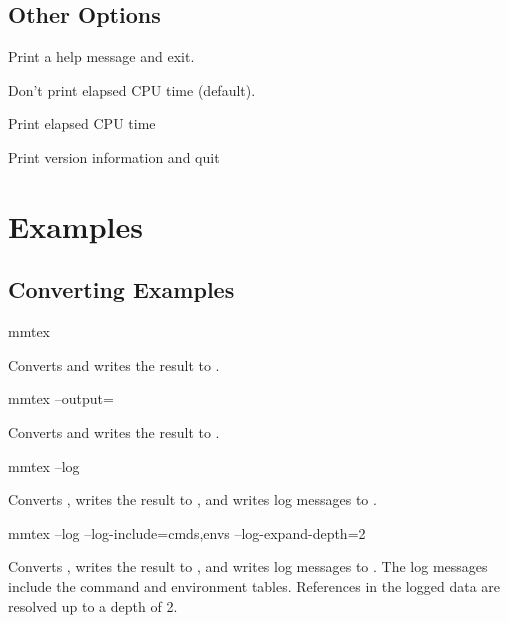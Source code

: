 \documentclass{webpage}
\begin{document}
\subsection{Other Options}

\begin{description}
  \item[--help]
    Print a help message and exit.
  \item[--notime]
    Don't print elapsed CPU time (default).
  \item[--time]
    Print elapsed CPU time
  \item[--version]
    Print version information and quit
\end{description}


\section{Examples}

\subsection{Converting Examples}

\begin{preformatted}[code]%
mmtex 
\end{preformatted}

Converts  and writes the result to .

\begin{preformatted}[code]%
mmtex  --output=
\end{preformatted}

Converts  and writes the result to .

\begin{preformatted}[code]%
mmtex  --log
\end{preformatted}

Converts , writes the result to , and writes log messages to
.

\begin{preformatted}[code]%
mmtex  --log --log-include=cmds,envs --log-expand-depth=2
\end{preformatted}

Converts , writes the result to , and writes log messages to
. The log messages include the command and environment tables. References in
the logged data are resolved up to a depth of 2.
\end{document}
